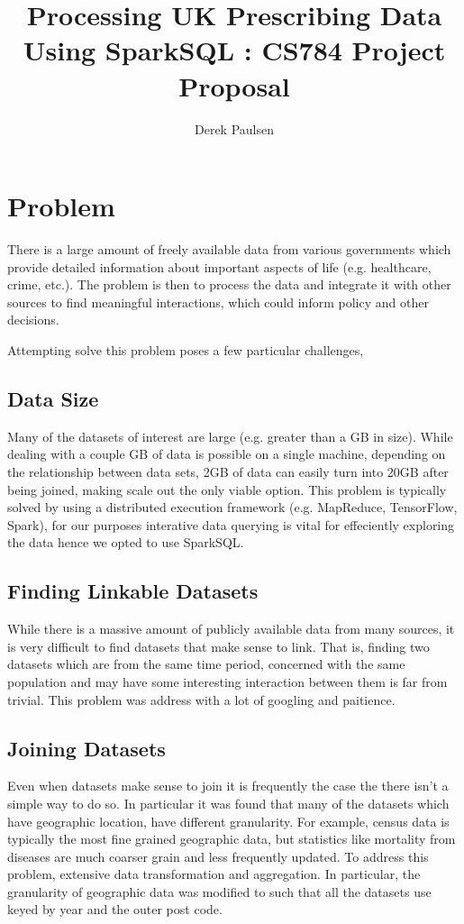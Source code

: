 \documentclass[a4paper]{article}
\author{Derek Paulsen}
\title{Processing UK Prescribing Data Using SparkSQL : CS784 Project Proposal}
\begin{document}
\maketitle
\section{Problem}
	There is a large amount of freely available data from various governments which provide detailed information 
	about important aspects of life (e.g. healthcare, crime, etc.). The problem is then to process the data and 
	integrate it with other sources to find meaningful interactions, which could inform policy and other decisions.

	Attempting solve this problem poses a few particular challenges,


	\subsection{Data Size}
		Many of the datasets of interest are large (e.g. greater than a GB in size). While dealing with a couple GB of data
		is possible on a single machine, depending on the relationship between data sets, 2GB of data can easily turn into
		20GB after being joined, making scale out the only viable option. This problem is typically solved by using a 
		distributed execution framework (e.g. MapReduce, TensorFlow, Spark), for our purposes interative data querying is 
		vital for effeciently exploring the data hence we opted to use SparkSQL.

	\subsection{Finding Linkable Datasets}
		While there is a massive amount of publicly available data from many sources, it is very difficult to find 
		datasets that make sense to link. That is, finding two datasets which are from the same time period, concerned with 
		the same population and may have some interesting interaction between them is far from trivial. This problem 
		was address with a lot of googling and paitience. %

	\subsection{Joining Datasets}
		Even when datasets make sense to join it is frequently the case the there isn't a simple way to do so. 
		In particular it was found that many of the datasets which have geographic location, have different granularity.
		For example, census data is typically the most fine grained geographic data, but statistics like mortality from
		diseases are much coarser grain and less frequently updated. To address this problem, extensive data transformation 
		and aggregation. In particular, the granularity of geographic data was modified to such that all the datasets 
		use keyed by year and the outer post code.
\end{document}
